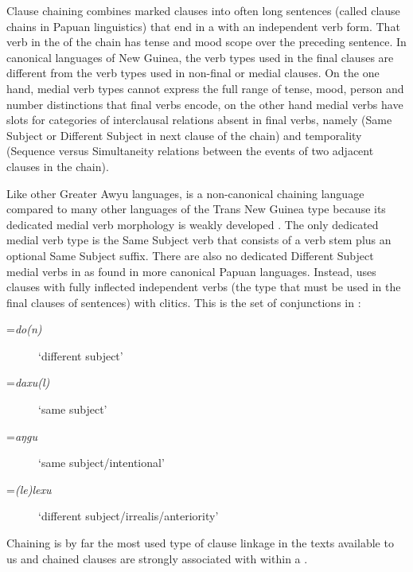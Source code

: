\documentclass[output=paper]{LSP/langsci}
\begin{document}
Clause chaining combines  marked clauses into often long sentences (called clause chains in Papuan linguistics) that end in a  with an independent verb form. That verb in the  of the chain has tense and mood scope over the preceding sentence. In canonical  languages of New Guinea, the verb types used in the final clauses are different from the verb types used in non-final or medial clauses. On the one hand, medial verb types  cannot express the full range of tense, mood, person and number distinctions that final verbs encode, on the other hand medial verbs have slots for categories of interclausal relations absent in final verbs, namely  (Same Subject or Different Subject in next clause of the chain) and temporality (Sequence versus Simultaneity relations between the events of two adjacent clauses in the chain).

Like other Greater Awyu languages,  is a non-canonical chaining language compared to many other languages of the Trans New Guinea type because its dedicated medial verb morphology is weakly developed \citep{devries.2010}. The only dedicated medial verb type is the Same Subject verb that consists of a verb stem plus an optional Same Subject suffix. There are also no dedicated Different Subject medial verbs in  as found in more canonical Papuan  languages. Instead,  uses clauses with fully inflected independent verbs (the type that must be used in the final clauses of sentences) with  clitics. This is the set of  conjunctions in   \citep[][109]{enk97}: 

\begin{description}
\item[=\textit{do(n)}] 		`different subject'
 		\item[=\textit{daxu(l)}] 	`same subject'
     	\item[=\textit{aŋgu}]			`same subject/intentional'
     	\item[=\textit{(le)lexu}]	`different subject/irrealis/anteriority'
\end{description}
		
Chaining is by far the most used type of clause linkage in the  texts available to us and chained clauses are strongly associated with  within a . 
\end{document}
